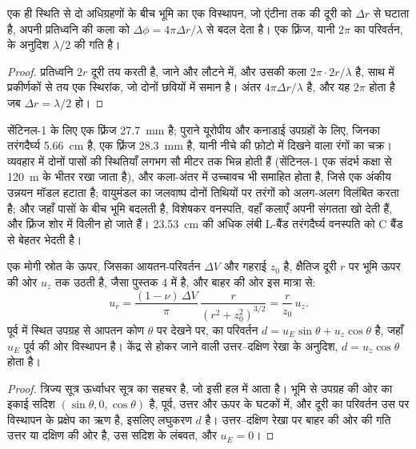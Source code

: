 \begin{theorem}[एक फ़्रिंज]\label{thm:b3:remote-sensing-gis:fringe}
एक ही स्थिति से दो अधिग्रहणों के बीच भूमि का एक विस्थापन, जो एंटीना तक की दूरी को
$\Delta r$ से घटाता है, अपनी प्रतिध्वनि की कला को
$\Delta\phi = 4\pi\Delta r/\lambda$ से बदल देता है। एक फ़्रिंज, यानी
$2\pi$ का परिवर्तन,  के अनुदिश $\lambda/2$ की गति है।
\end{theorem}

\begin{proof}
प्रतिध्वनि $2r$ दूरी तय करती है, जाने और लौटने में, और उसकी कला
$2\pi\cdot 2r/\lambda$ है, साथ में प्रकीर्णकों से तय एक स्थिरांक, जो दोनों
छवियों में समान है। अंतर $4\pi\Delta r/\lambda$ है, और यह $2\pi$ होता है
जब $\Delta r = \lambda/2$ हो।
\end{proof}

सेंटिनल-1 के लिए एक फ़्रिंज \qty{27.7}{mm} है; पुराने यूरोपीय और
कनाडाई उपग्रहों के लिए, जिनका तरंगदैर्घ्य \qty{5.66}{cm} है, एक फ़्रिंज \qty{28.3}{mm} है,
यानी नीचे की फ़ोटो में दिखने वाला रंगों का चक्र। व्यवहार में दोनों पासों की स्थितियाँ
लगभग सौ मीटर तक भिन्न होती हैं (सेंटिनल-1 एक संदर्भ कक्षा से
\qty{120}{m} के भीतर रखा जाता है), और कला-अंतर में उच्चावच भी समाहित होता है,
जिसे एक अंकीय उन्नयन मॉडल हटाता है; वायुमंडल का जलवाष्प दोनों तिथियों पर तरंगों को
अलग-अलग विलंबित करता है; और जहाँ पासों के बीच भूमि बदलती है, विशेषकर वनस्पति,
वहाँ कलाएँ अपनी संगतता खो देती हैं,
और फ़्रिंज शोर में विलीन हो जाते हैं। \qty{23.53}{cm} की अधिक लंबी
L-बैंड तरंगदैर्घ्य वनस्पति को C बैंड से बेहतर
भेदती है।

\begin{proposition}[दृष्टि-रेखा के अनुदिश देखा गया एक मोगी स्रोत]\label{prop:b3:remote-sensing-gis:mogi-los}
एक मोगी स्रोत के ऊपर, जिसका आयतन-परिवर्तन $\Delta V$ और गहराई $z_0$ है, क्षैतिज
दूरी $r$ पर भूमि ऊपर की ओर $u_z$ तक उठती है, जैसा पुस्तक 4 में है,
और बाहर की ओर इस मात्रा से:
\[
u_r = \frac{(1 - \nu)\,\Delta V}{\pi}\,\frac{r}{(r^2 + z_0^2)^{3/2}} = \frac{r}{z_0}\,u_z .
\]
पूर्व में स्थित उपग्रह से आपतन कोण $\theta$ पर देखने पर, 
का परिवर्तन $d = u_E\sin\theta + u_z\cos\theta$ है, जहाँ $u_E$
पूर्व की ओर विस्थापन है। केंद्र से होकर जाने वाली उत्तर--दक्षिण रेखा के अनुदिश,
$d = u_z\cos\theta$ होता है।
\end{proposition}

\begin{proof}
त्रिज्य सूत्र ऊर्ध्वाधर सूत्र का सहचर है, जो
इसी हल में आता है। भूमि से उपग्रह की ओर का इकाई सदिश
$(\sin\theta, 0, \cos\theta)$ है, पूर्व, उत्तर और ऊपर के घटकों में, और दूरी का
परिवर्तन उस पर विस्थापन के प्रक्षेप का ऋण है, इसलिए
लघुकरण $d$ है। उत्तर--दक्षिण रेखा पर बाहर की ओर की गति
उत्तर या दक्षिण की ओर है, उस सदिश के लंबवत, और $u_E = 0$।
\end{proof}

